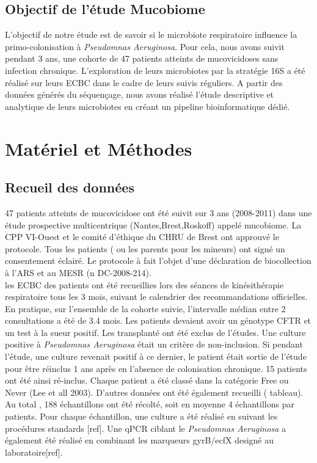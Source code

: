 \documentclass[12pt,a4paper]{article}
\begin{document}
\subsection{Objectif de l'étude Mucobiome}
L'objectif de notre étude est de savoir si le microbiote respiratoire influence la primo-colonisation à \textit{Pseudomnas Aeruginosa}. 
Pour cela, nous avons suivit pendant 3 ans,  une cohorte de 47 patients atteints de mucovicidoses sans infection chronique. 
L'exploration de leurs microbiotes par la stratégie 16S a été réalisé sur leurs ECBC dans le cadre de leurs suivis réguliers. 
A partir des données générés du séquençage, nous avons réalisé l'étude descriptive et analytique de leurs microbiotes en créant un pipeline bioinformatique dédié. 

\section{Matériel et Méthodes}
\subsection{Recueil des données}

47 patients atteints de mucovicidose ont été suivit sur 3 ans (2008-2011) dans une étude prospective multicentrique (Nantes,Brest,Roskoff) appelé mucobiome.
La CPP VI-Ouest et le comité d’éthique du CHRU de Brest ont approuvé le protocole. Tous les patients ( ou les parents pour les mineurs) ont signé un consentement éclairé. Le protocole à fait l’objet d’une déclaration de biocollection à l’ARS et au MESR (n DC-2008-214).\\
les ECBC des patients ont été recueillies lors des séances de kinésithérapie respiratoire tous les 3 mois, suivant le calendrier des recommandations officielles. En pratique, sur l’ensemble de la cohorte suivie, l’intervalle médian entre 2 consultations a été de 3.4 mois.
Les patients devaient avoir un génotype CFTR et un test à la sueur positif. Les transplanté ont été exclus de l’études.
Une culture positive à \textit{Pseudomnas Aeruginosa} était un critère de non-inclusion. Si pendant l’étude, une culture revenait positif à ce dernier, le patient était sortie de l’étude pour être réinclus 1 ans après en l’absence de colonisation chronique. 15 patients ont été ainsi ré-inclus.
Chaque patient a été classé dans la catégorie Free ou Never (Lee et all 2003). D’autres données ont été également recueilli ( tableau).
Au total , 188 échantillons ont été récolté, soit en moyenne 4 échantillons par patients.
Pour chaque échantillon, une culture a été réalisé en suivant les procédures standards [ref]. Une qPCR ciblant le \textit{Pseudomnas Aeruginosa} a également été réalisé en combinant les marqueurs gyrB/ecfX designé au laboratoire[ref].
\end{document}
